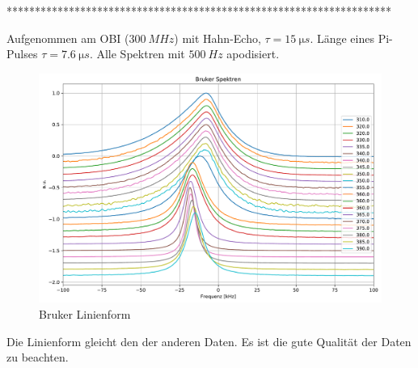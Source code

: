 ********************************************************************







Aufgenommen am OBI ($\SI{300}{MHz}$) mit Hahn-Echo, $\tau = \SI{15}{\micro s}$. Länge eines Pi-Pulses $\tau = \SI{7.6}{\micro s}$. Alle Spektren mit $\SI{500}{Hz}$ apodisiert.

\begin{figure}
	\begin{center}
		\includegraphics[width=\textwidth]{graphics/plots/BRUKER/bruker_lineshape.pdf}
	\end{center}
	\caption{Bruker Linienform} \label{fig:res:bruker_linienform}
\end{figure}
Die Linienform gleicht den der anderen Daten. Es ist die gute Qualität der Daten zu beachten.

